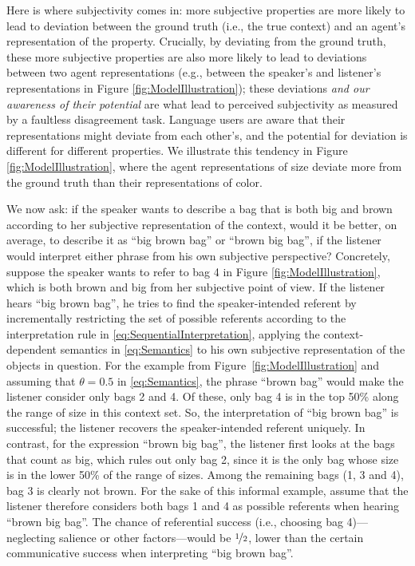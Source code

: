 \documentclass[10pt,a4paper]{article}
\begin{document}
Here is where subjectivity comes in: more subjective properties are more likely to lead to deviation between the ground truth (i.e., the true context) and an agent's representation of the property. Crucially, by deviating from the ground truth, these more subjective properties are also more likely to lead to deviations between two agent representations (e.g., between the speaker's and listener's representations in Figure \ref{fig:ModelIllustration}); these deviations \emph{and our awareness of their potential} are what lead to perceived subjectivity as measured by a faultless disagreement task. Language users are aware that their representations might deviate from each other's, and the potential for deviation is different for different properties. We illustrate this tendency in Figure \ref{fig:ModelIllustration}, where the agent representations of size deviate more from the ground truth than their representations of color.

We now ask: if the speaker wants to describe a bag that is both big and brown according to her subjective representation of the context, would it be better, on average, to describe it as ``big brown bag'' or ``brown big bag'', if the listener would interpret either phrase from his own subjective perspective? Concretely, suppose the speaker wants to refer to bag 4 in Figure \ref{fig:ModelIllustration}, which is both brown and big from her subjective point of view. If the listener hears ``big brown bag'', he tries to find the speaker-intended referent by incrementally restricting the set of possible referents according to the interpretation rule in \eqref{eq:SequentialInterpretation}, applying the context-dependent semantics in \eqref{eq:Semantics} to his own subjective representation of the objects in question. For the example from Figure~\ref{fig:ModelIllustration} and assuming that $\theta = 0.5$ in \eqref{eq:Semantics}, the phrase ``brown bag'' would make the listener consider only bags 2 and 4. Of these, only bag 4 is in the top 50\% along the range of size in this context set. So, the interpretation of ``big brown bag'' is successful; the listener recovers the speaker-intended referent uniquely. In contrast, for the expression ``brown big bag'', the listener first looks at the bags that count as big, which rules out only bag 2, since it is the only bag whose size is in the lower 50\% of the range of sizes. Among the remaining bags (1, 3 and 4), bag 3 is clearly not brown. For the sake of this informal example, assume that the listener therefore considers both bags 1 and 4 as possible referents when hearing ``brown big bag''. The chance of referential success (i.e., choosing bag 4)---neglecting salience or other factors---would be $\nicefrac{1}{2}$, lower than the certain communicative success when interpreting ``big brown bag''.
\end{document}
